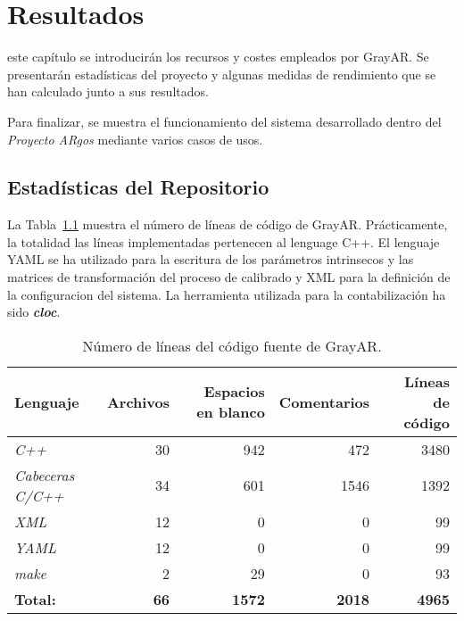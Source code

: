 \chapter{Resultados}
\label{chap:resultados}

 este capítulo se introducirán los recursos y costes empleados por GrayAR. Se presentarán estadísticas del proyecto y algunas medidas de rendimiento que se han calculado junto a sus
resultados. %

Para finalizar, se muestra el funcionamiento del sistema desarrollado dentro del \textit{Proyecto ARgos} mediante varios casos de usos.  

\section{Estadísticas del Repositorio}
La Tabla~\ref{tab:number_of_lines} muestra el número de líneas de código de GrayAR. Prácticamente, la totalidad las líneas implementadas pertenecen al lenguage C++. El lenguaje YAML se ha utilizado para la escritura de los parámetros intrinsecos y las matrices de transformación del proceso de calibrado y XML para la definición de la configuracion del sistema. La herramienta utilizada para la contabilización ha sido \textbf{\textit{cloc}}.

\begin{table}[h]
  \centering
  \begin{tabular}{|l|r|r|r|r|}
    \hline
    \textbf{Lenguaje} & \textbf{Archivos} & \textbf{Espacios en blanco} & \textbf{Comentarios} & \textbf{Líneas de código} \\
    \hline
    \textit{C++} & 30 & 942 & 472 & 3480 \\
    \hline
    \textit{Cabeceras C/C++} & 34 & 601 & 1546 & 1392 \\
    \hline
    \textit{XML} & 12 & 0 & 0 & 99 \\
    \hline
    \textit{YAML} & 12 & 0 & 0 & 99 \\
    \hline
    \textit{make} & 2 & 29 & 0 & 93 \\
    \hline
    \textbf{Total:} & \textbf{66} & \textbf{1572} & \textbf{2018} & \textbf{4965} \\
    \hline
  \end{tabular}
  \caption{Número de líneas del código fuente de GrayAR.}
  \label{tab:number_of_lines}
\end{table}

